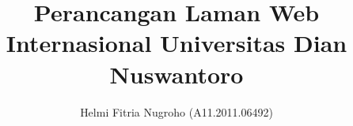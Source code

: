 \documentclass[a4paper, 12pt, oneside]{memoir}
\author{Helmi Fitria Nugroho (A11.2011.06492)}
\title{Perancangan Laman Web Internasional Universitas Dian Nuswantoro}
\begin{document}
\bahasahyphenmins
\datebahasa
\captionsbahasa



%

\begin{Spacing}{1.5}













\end{Spacing}

\begin{Spacing}{1}



%

\end{Spacing}

\clearpage








%

%



\end{document}
